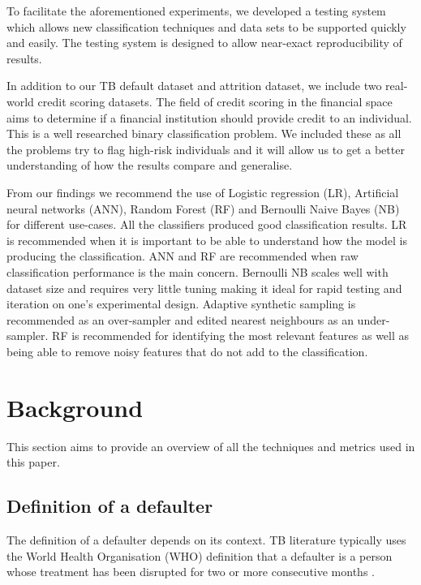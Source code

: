 \documentclass{sig-alternate-05-2015}
\begin{document}
	To facilitate the aforementioned experiments, we developed a testing system which allows new classification techniques and data sets to be supported quickly and easily. The testing system is designed to allow near-exact reproducibility of results.
	
	In addition to our TB default dataset and attrition dataset, we include two real-world credit scoring datasets. The field of credit scoring in the financial space aims to determine if a financial institution should provide credit to an individual. This is a well researched binary classification problem. We included these as all the problems try to flag high-risk individuals and it will allow us to get a better understanding of how the results compare and generalise.
	
	From our findings we recommend the use of Logistic regression (LR), Artificial neural networks (ANN), Random Forest (RF) and Bernoulli Naive Bayes (NB) for different use-cases. All the classifiers produced good classification results. LR is recommended when it is important to be able to understand how the model is producing the classification. ANN and RF are recommended when raw classification performance is the main concern. Bernoulli NB scales well with dataset size and requires very little tuning making it ideal for rapid testing and iteration on one's experimental design. Adaptive synthetic sampling is recommended as an over-sampler and edited nearest neighbours as an under-sampler. RF is recommended for identifying the most relevant features as well as being able to remove noisy features that do not add to the classification.
	
	\section{Background}
	This section aims to provide an overview of all the techniques and metrics used in this paper.
	\subsection{Definition of a defaulter}
	The definition of a defaulter depends on its context. TB literature typically uses the World Health Organisation (WHO) definition that a defaulter is a person whose treatment has been disrupted for two or more consecutive months \cite{chan:2003prevalence, cherkaoui:19326203, Jha:10.1371/journal.pone.0008873,jittimanee:10.1111/j.1440-172X.2007.00650.x,muture:6660173120110101, world2015TB}.
	
\end{document}
